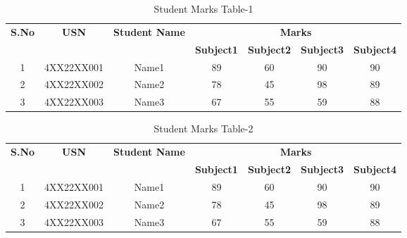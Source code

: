 \documentclass{article}
\begin{document}
\begin{table}[h!]
\centering
\caption{Student Marks Table-1}
\begin{tabular}{|c|c|c|c|c|c|c|}
\hline
\textbf{S.No} & \textbf{USN} & \textbf{Student Name} & \multicolumn{4}{c|}{\textbf{Marks}} \\
\cline{4-7}
 & & & \textbf{Subject1} & \textbf{Subject2} & \textbf{Subject3} & \textbf{Subject4} \\
\hline
1 & 4XX22XX001 & Name1 & 89 & 60 & 90 & 90 \\
\hline
2 & 4XX22XX002 & Name2 & 78 & 45 & 98 & 89 \\
\hline
3 & 4XX22XX003 & Name3 & 67 & 55 & 59 & 88 \\
\hline
\end{tabular}
\end{table}
\begin{table}[h!]
\centering
\caption{Student Marks Table-2}
\begin{tabular}{|c|c|c|c|c|c|c|}
\hline
\textbf{S.No} & \textbf{USN} & \textbf{Student Name} & \multicolumn{4}{c|}{\textbf{Marks}} \\
\cline{4-7}
 & & & \textbf{Subject1} & \textbf{Subject2} & \textbf{Subject3} & \textbf{Subject4} \\
\hline
1 & 4XX22XX001 & Name1 & 89 & 60 & 90 & 90 \\
\hline
2 & 4XX22XX002 & Name2 & 78 & 45 & 98 & 89 \\
\hline
3 & 4XX22XX003 & Name3 & 67 & 55 & 59 & 88 \\
\hline
\end{tabular}
\label{tab:student_marks}
\end{table}
\end{document}
